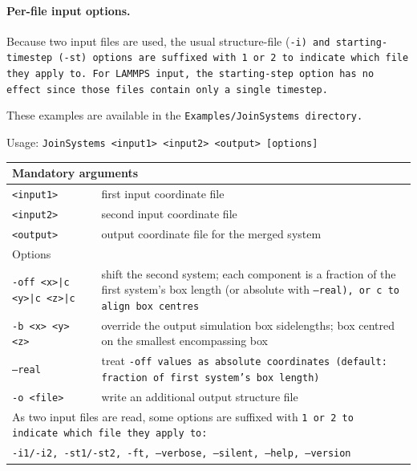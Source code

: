 \paragraph{Per-file input options.}
Because two input files are used, the usual structure-file (\tt{-i}) and
starting-timestep (\tt{-st}) options are suffixed with \tt{1} or \tt{2} to
indicate which file they apply to. For LAMMPS \data input, the starting-step
option has no effect since those files contain only a single timestep.

These examples are available in the \tt{Examples/JoinSystems} directory.

\vspace{1em}
\noindent
Usage: \tt{JoinSystems <input1> <input2> <output> [options]}

\noindent
\begin{longtable}{p{}p{}}
  \toprule
  \multicolumn{2}{l}{Mandatory arguments}\\
  \midrule
  \tt{<input1>} & first input coordinate file\\
  \tt{<input2>} & second input coordinate file\\
  \tt{<output>} & output coordinate file for the merged system\\
  \toprule
  \multicolumn{2}{l}{Options}\\
  \midrule
  \tt{-off <x>|c <y>|c <z>|c}  & shift the second system; each component is
                                  a fraction of the first system's box length
                                  (or absolute with \tt{--real}), or \tt{c}
                                  to align box centres\\
  \tt{-b <x> <y> <z>}           & override the output simulation box
                                  sidelengths; box centred on the smallest
                                  encompassing box\\
  \tt{--real}                    & treat \tt{-off} values as absolute
                                  coordinates (default: fraction of first
                                  system's box length)\\
  \tt{-o <file>}                 & write an additional output structure file\\
  \midrule
  \multicolumn{2}{p{0.948\textwidth}}{As two input files are read, some
    options are suffixed with \tt{1} or \tt{2} to indicate which file they
    apply to:}\\
  \midrule
  \multicolumn{2}{p{0.948\textwidth}}{\tt{-i1}/\tt{-i2},
                                      \tt{-st1}/\tt{-st2},
                                      \tt{-ft},
                                      \tt{--verbose},
                                      \tt{--silent},
                                      \tt{--help},
                                      \tt{--version}}\\
  \bottomrule
\end{longtable}

